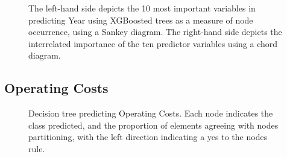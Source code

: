 \documentclass[review,12pt,authoryear]{elsarticle}
\begin{document}
\begin{linenumbers}
\begin{figure}
  \caption{The left-hand side depicts the 10 most important variables in predicting Year using XGBoosted trees as a measure of node occurrence, using a Sankey diagram. The right-hand side depicts the interrelated importance of the ten predictor variables using a chord diagram.}\label{fig:year_sankey}
\end{figure}

\subsection{Operating Costs}

\begin{figure}
  \caption{Decision tree predicting Operating Costs. Each node indicates the class predicted, and the proportion of elements agreeing with nodes partitioning, with the left direction indicating a yes to the nodes rule.}\label{fig:operating_costs_tree}
\end{figure}


\end{linenumbers}
\end{document}
